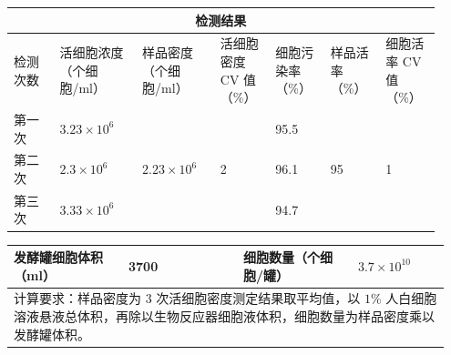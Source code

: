 \documentclass[UTF8,10pt,a4paper,fontset=fandol]{ctexart}
\newcommand{\fieldvalue}[1]{#1}
\newcommand{\handwritten}[1]{#1}
\begin{document}
\medskip
\begin{center}
\begin{tabular}{|p{0.10\linewidth}|p{0.18\linewidth}|p{0.17\linewidth}|p{0.12\linewidth}|p{0.12\linewidth}|p{0.12\linewidth}|p{0.12\linewidth}|}
\hline
\multicolumn{7}{|c|}{检测结果} \\ \hline
检测次数 &
活细胞浓度（个细胞/ml） &
样品密度（个细胞/ml） &
活细胞密度 CV 值（\%） &
细胞污染率（\%） &
样品活率（\%） &
细胞活率 CV 值（\%） \\ \hline

第一次 &
\fieldvalue{\handwritten{$3.23\times10^{6}$}} &
&
&
\fieldvalue{\handwritten{95.5}} &
& \\ \hline

第二次 &
\fieldvalue{\handwritten{$2.3\times10^{6}$}} &
\fieldvalue{\handwritten{$2.23\times10^{6}$}} &
\fieldvalue{\handwritten{2}} &
\fieldvalue{\handwritten{96.1}} &
\fieldvalue{\handwritten{95}} &
\fieldvalue{\handwritten{1}} \\ \hline

第三次 &
\fieldvalue{\handwritten{$3.33\times10^{6}$}} &
&
&
\fieldvalue{\handwritten{94.7}} &
& \\ \hline
\end{tabular}
\end{center}

\noindent
\begin{tabular}{|p{0.25\linewidth}|p{0.25\linewidth}|p{0.25\linewidth}|p{0.20\linewidth}|}
\hline
发酵罐细胞体积（ml） &
\fieldvalue{\handwritten{3700}} &
细胞数量（个细胞/罐） &
\fieldvalue{\handwritten{$3.7\times10^{10}$}} \\ \hline
\multicolumn{4}{|p{0.95\linewidth}|}{
计算要求：样品密度为 $3$ 次活细胞密度测定结果取平均值，以 $1\%$ 人白细胞溶液悬液总体积，再除以生物反应器细胞液体积，细胞数量为样品密度乘以发酵罐体积。
} \\ \hline
\end{tabular}
\end{document}
